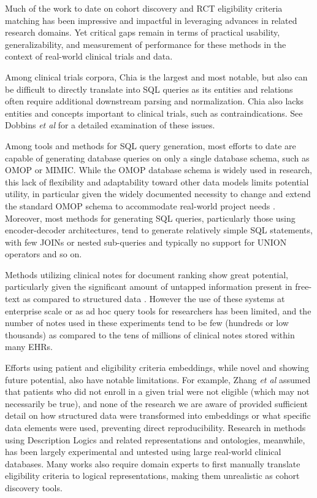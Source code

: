 \documentclass[../main.tex]{subfiles}
\begin{document}
Much of the work to date on cohort discovery and RCT eligibility criteria matching has been impressive and impactful in leveraging advances in related research domains. Yet critical gaps remain in terms of practical usability, generalizability, and measurement of performance for these methods in the context of real-world clinical trials and data. 

Among clinical trials corpora, Chia is the largest and most notable, but also can be difficult to directly translate into SQL queries as its entities and relations often require additional downstream parsing and normalization. Chia also lacks entities and concepts important to clinical trials, such as contraindications. See Dobbins \textit{et al} \cite{dobbins2022leaf} for a detailed examination of these issues.

Among tools and methods for SQL query generation, most efforts to date are capable of generating database queries on only a single database schema, such as OMOP or MIMIC. While the OMOP database schema is widely used in research, this lack of flexibility and adaptability toward other data models limits potential utility, in particular given the widely documented necessity to change and extend the standard OMOP schema to accommodate real-world project needs \cite{belenkaya2021extending, peng2021towards, zoch2021adaption, warner2019hemonc, zhou2013evaluation, shin2019genomic, kwon2019development}. Moreover, most methods for generating SQL queries, particularly those using encoder-decoder architectures, tend to generate relatively simple SQL statements, with few JOINs or nested sub-queries and typically no support for UNION operators and so on.

Methods utilizing clinical notes for document ranking show great potential, particularly given the significant amount of untapped information present in free-text as compared to structured data \cite{warrer2012using}. However the use of these systems at enterprise scale or as ad hoc query tools for researchers has been limited, and the number of notes used in these experiments tend to be few (hundreds or low thousands) as compared to the tens of millions of clinical notes stored within many EHRs. 

Efforts using patient and eligibility criteria embeddings, while novel and showing future potential, also have notable limitations. For example, Zhang \textit{et al} assumed that patients who did not enroll in a given trial were not eligible (which may not necessarily be true), and none of the research we are aware of provided sufficient detail on how structured data were transformed into embeddings or what specific data elements were used, preventing direct reproducibility. Research in methods using Description Logics and related representations and ontologies, meanwhile, has been largely experimental and untested using large real-world clinical databases. Many works also require domain experts to first manually translate eligibility criteria to logical representations, making them unrealistic as cohort discovery tools. 
\end{document}
